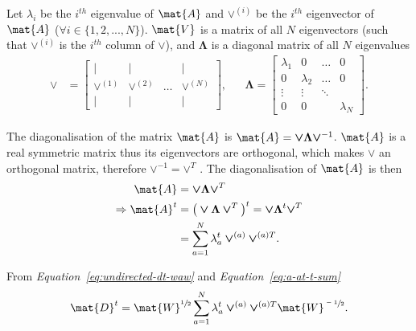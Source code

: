 \documentclass[12pt]{report}
\begin{document}
%
%


Let $\lambda_i$ be the $i^{th}$ eigenvalue of $\mat{A}$ and $\bm{\vee}^{(i)}$ be
the $i^{th}$ eigenvector of $\mat{A}$ ($\forall i \in \{ 1, 2, ..., N \}$).
$\mat{V}$ is a matrix of all $N$ eigenvectors (such that $\bm{\vee}^{(i)}$ is
the $i^{th}$ column of $\bm{\vee}$), and $\bm{\Lambda}$ is a diagonal matrix
of all $N$ eigenvalues
%
\begin{align}
  \bm{\vee} &= \begin{bmatrix}
    \vert           & \vert           &       & \vert \\
    \bm{\vee}^{(1)} & \bm{\vee}^{(2)} & \dots & \bm{\vee}^{(N)} \\
    \vert           & \vert           &       & \vert \end{bmatrix}, &&
  \bm{\Lambda} = \begin{bmatrix}
    \lambda_1 & 0 		      & \dots  & 0 \\
    0 	 	    & \lambda_2   & \dots  & 0 \\
    \vdots 	  & \vdots	    & \ddots &   \\
    0	        & 0           &        & \lambda_N
  \end{bmatrix}.
\end{align}


%
%


The diagonalisation of the matrix $\mat{A}$ is $\mat{A} = \bm{\vee} \bm{\Lambda}
\bm{\vee}^{-1}$.
$\mat{A}$ is a real symmetric matrix thus its eigenvectors are orthogonal, which
makes $\bm{\vee}$ an orthogonal matrix, therefore $\bm{\vee}^{-1} = \bm{\vee}^{T}$
\cite{eigval_and_eigvec}. The diagonalisation of $\mat{A}$ is then
%
\begin{align}
  \mat{A} &= \bm{\vee} \bm{\Lambda} \bm{\vee}^{T} \\
  \Rightarrow \mat{A}^t &= \big(\bm{\vee} \bm{\Lambda} \bm{\vee}^{T}\big)^t
                  = \bm{\vee} \bm{\Lambda}^t \bm{\vee}^{T} \\
  \label{eq:a-at-t-sum}
                  &= \sum_{a=1}^{N} \lambda_a^t \bm{\vee}^{(a)} \bm{\vee}^{(a)T}.
\end{align}


From \emph{Equation~\ref{eq:undirected-dt-waw}} and \emph{Equation~\ref{eq:a-at-t-sum}}
\begin{equation}
  \label{eq:d-at-t-with-a}
  \mat{D}^t = \mat{W}^{\sfrac{1}{2}} \sum_{a=1}^{N} \lambda_a^t \bm{\vee}^{(a)}
    \bm{\vee}^{(a)T} \mat{W}^{\sfrac{-1}{2}}.
\end{equation}
\end{document}
